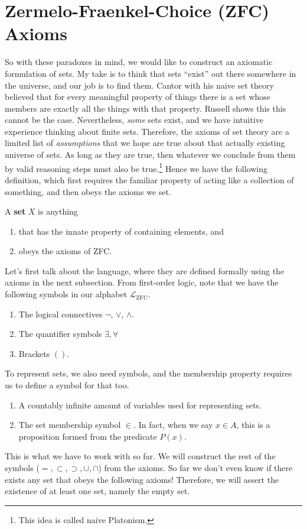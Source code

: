 \section{Zermelo-Fraenkel-Choice (ZFC) Axioms} 

  So with these paradoxes in mind, we would like to construct an axiomatic formulation of sets. My take is to think that sets ``exist'' out there somewhere in the universe, and our job is to find them. Cantor with his naive set theory believed that for every meaningful property of things there is a set whose members are exactly all the things with that property. Russell shows this this cannot be the case. Nevertheless, \textit{some} sets exist, and we have intuitive experience thinking about finite sets. Therefore, the axioms of set theory are a limited list of \textit{assumptions} that we hope are true about that actually existing universe of sets. As long as they are true, then whatever we conclude from them by valid reasoning steps must also be true.\footnote{This idea is called naive Platonism.} Hence we have the following definition, which first requires the familiar property of acting like a collection of something, and then obeys the axioms we set. 
  
  \begin{definition}[Set]
    A \textbf{set} $X$ is anything 
    \begin{enumerate}
      \item that has the innate property of containing elements, and 
      \item obeys the axioms of ZFC. 
    \end{enumerate}
  \end{definition}  

  Let's first talk about the language, where they are defined formally using the axioms in the next subsection. From first-order logic, note that we have the following symbols in our alphabet $\mathcal{L}_{\mathrm{ZFC}}$. 
  \begin{enumerate}
    \item The logical connectives $\neg$, $\lor$, $\land$. 
    \item The quantifier symbols $\exists, \forall$ 
    \item Brackets $()$. 
  \end{enumerate}
  To represent sets, we also need symbols, and the membership property requires us to define a symbol for that too. 
  \begin{enumerate}
    \item A countably infinite amount of variables used for representing sets. 
    \item The set membership symbol $\in$. In fact, when we say $x \in A$, this is a proposition formed from the predicate $P(x)$. 
  \end{enumerate} 
  This is what we have to work with so far. We will construct the rest of the symbols ($=, \subset, \supset, \cup, \cap$) from the axioms. So far we don't even know if there exists any set that obeys the following axioms! Therefore, we will assert the existence of at least one set, namely the empty set. 

